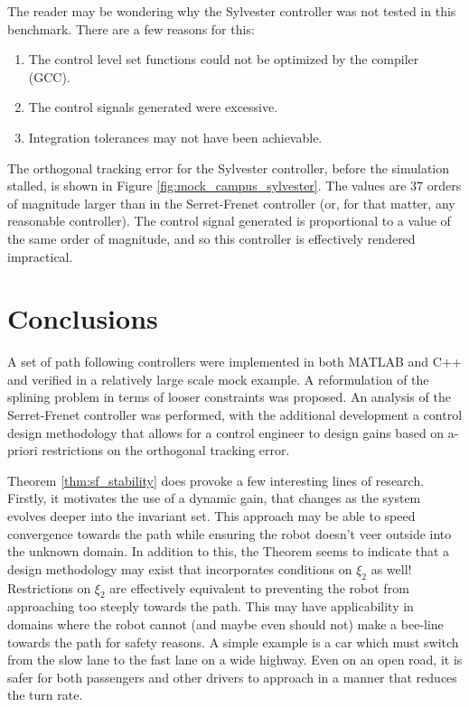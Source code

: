 \documentclass[oneside, 11pt]{book}
\begin{document}
The reader may be wondering why the Sylvester controller was not tested in this benchmark. There are a few reasons for this:
\begin{enumerate}
    \item The control level set functions could not be optimized by the compiler (GCC).
    \item The control signals generated were excessive.
    \item Integration tolerances may not have been achievable.
\end{enumerate}
The orthogonal tracking error for the Sylvester controller, before the simulation stalled, is shown in Figure \ref{fig:mock_campus_sylvester}. The values are 37 orders of magnitude larger than in the Serret-Frenet controller (or, for that matter, any reasonable controller). The control signal generated is proportional to a value of the same order of magnitude, and so this controller is effectively rendered impractical.

\section{Conclusions}
A set of path following controllers were implemented in both MATLAB and C++ and verified in a relatively large scale mock example. A reformulation of the splining problem in terms of looser constraints was proposed. An analysis of the Serret-Frenet controller was performed, with the additional development a control design methodology that allows for a control engineer to design gains based on a-priori restrictions on the orthogonal tracking error.

Theorem \ref{thm:sf_stability} does provoke a few interesting lines of research. Firstly, it motivates the use of a dynamic gain, that changes as the system evolves deeper into the invariant set. This approach may be able to speed convergence towards the path while ensuring the robot doesn't veer outside into the unknown domain. In addition to this, the Theorem seems to indicate that a design methodology may exist that incorporates conditions on $\xi_2$ as well! Restrictions on $\xi_2$ are effectively equivalent to preventing the robot from approaching too steeply towards the path. This may have applicability in domains where the robot cannot (and maybe even should not) make a bee-line towards the path for safety reasons. A simple example is a car which must switch from the slow lane to the fast lane on a wide highway. Even on an open road, it is safer for both passengers and other drivers to approach in a manner that reduces the turn rate.
\end{document}
